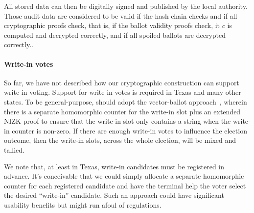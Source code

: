All stored data can then be digitally signed and published by the
local authority. Those audit data are considered to be valid if the
hash chain checks and if all cryptographic proofs check, that is, if
the ballot validity proofs check, it $c$ is computed and decrypted
correctly, and if all spoiled ballots are decrypted correctly..

\paragraph{Write-in votes}
So far, we have not described how our cryptographic construction can
support write-in voting. Support for write-in votes is required in Texas
and many other states. To be general-purpose, \projname should adopt
the vector-ballot approach~\cite{kiayias04vectorBallot}, wherein there
is a separate homomorphic counter for the write-in slot plus
an extended NIZK proof to ensure that the write-in slot only contains
a string when the write-in counter is non-zero. If there are enough
write-in votes to influence the election outcome, then the write-in slots, across the whole
election, will be mixed and tallied.

We note that, at least in Texas, write-in candidates must be
registered in advance. It's conceivable that we could simply allocate
a separate homomorphic counter for each registered candidate and have
the \projname terminal help the voter select the desired ``write-in''
candidate. Such an approach could have significant usability benefits
but might run afoul of regulations.

